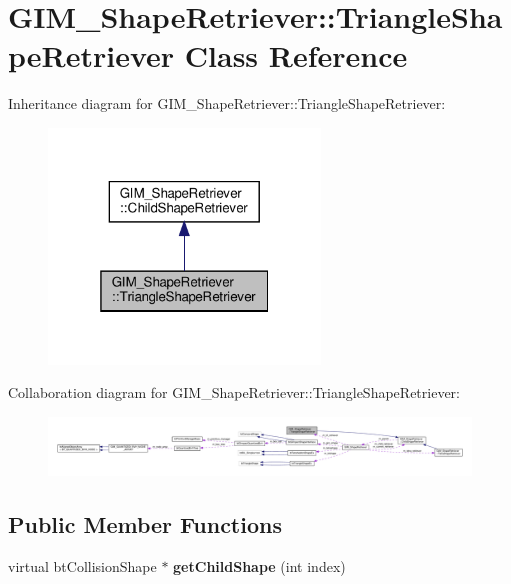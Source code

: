 \hypertarget{classGIM__ShapeRetriever_1_1TriangleShapeRetriever}{}\section{G\+I\+M\+\_\+\+Shape\+Retriever\+:\+:Triangle\+Shape\+Retriever Class Reference}
\label{classGIM__ShapeRetriever_1_1TriangleShapeRetriever}


Inheritance diagram for G\+I\+M\+\_\+\+Shape\+Retriever\+:\+:Triangle\+Shape\+Retriever\+:
\nopagebreak
\begin{figure}[H]
\begin{center}
\leavevmode
\includegraphics[width=205pt]{classGIM__ShapeRetriever_1_1TriangleShapeRetriever__inherit__graph}
\end{center}
\end{figure}


Collaboration diagram for G\+I\+M\+\_\+\+Shape\+Retriever\+:\+:Triangle\+Shape\+Retriever\+:
\nopagebreak
\begin{figure}[H]
\begin{center}
\leavevmode
\includegraphics[width=350pt]{classGIM__ShapeRetriever_1_1TriangleShapeRetriever__coll__graph}
\end{center}
\end{figure}
\subsection*{Public Member Functions}
\begin{DoxyCompactItemize}
\item 
\mbox{\label{classGIM__ShapeRetriever_1_1TriangleShapeRetriever_a98f27b2f6747fec538220ae796625d30}} 
virtual bt\+Collision\+Shape $\ast$ {\bfseries get\+Child\+Shape} (int index)
\end{DoxyCompactItemize}
